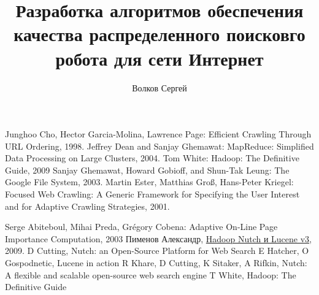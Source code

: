\documentclass[a4paper,10pt]{report}
\title{Разработка алгоритмов обеспечения качества распределенного поисковго робота для сети Интернет}
\author{Волков Сергей}
\begin{document}
\maketitle
\tableofcontents







\begin{thebibliography}{9}
 Junghoo Cho, Hector Garcia-Molina, Lawrence Page: Efficient Crawling Through URL Ordering, 1998.
 Jeffrey Dean and Sanjay Ghemawat: MapReduce: Simplified Data Processing on Large Clusters, 2004.
 Tom White: Hadoop: The Definitive Guide, 2009
 Sanjay Ghemawat, Howard Gobioff, and Shun-Tak Leung: The Google File System, 2003.
 Martin Ester, Matthias Groß, Hans-Peter Kriegel: Focused Web Crawling: A Generic Framework for Specifying the User Interest and for Adaptive Crawling Strategies, 2001.

 Serge Abiteboul, Mihai Preda, Grégory Cobena: Adaptive On-Line Page Importance Computation, 2003
 Пименов Александр, \href{http://mmcg.z52.ru/drupal/node/3}{Hadoop Nutch и Lucene v3}, 2009.
 D Cutting, Nutch: an Open-Source Platform for Web Search
 E Hatcher, O Gospodnetic, Lucene in action
 R Khare, D Cutting, K Sitaker, A Rifkin, Nutch: A flexible and scalable open-source web search engine
 T White, Hadoop: The Definitive Guide

\end{thebibliography}
\end{document}
